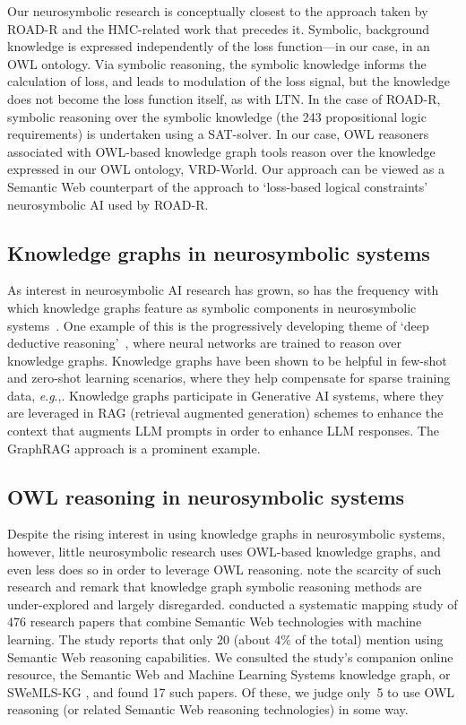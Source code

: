 \documentclass[]{jair}
\newcommand{\eg}{\textit{e}.\textit{g}.,\xspace}
\begin{document}
Our neurosymbolic research is conceptually closest to the approach taken by ROAD-R and the HMC-related work that precedes it.
Symbolic, background knowledge is expressed independently of the loss function---in our case, in an OWL ontology.
Via symbolic reasoning, the symbolic knowledge informs the calculation of loss, and leads to modulation of the loss signal, but the knowledge does not become the loss function itself, as with LTN.
In the case of ROAD-R, symbolic reasoning over the symbolic knowledge (the 243 propositional logic requirements) is undertaken using a SAT-solver.
In our case, OWL reasoners associated with OWL-based knowledge graph tools reason over the knowledge expressed in our OWL ontology, VRD-World.
Our approach can be viewed as a Semantic Web counterpart of the approach to `loss-based logical constraints' neurosymbolic AI used by ROAD-R.

\subsection{Knowledge graphs in neurosymbolic systems}
As interest in neurosymbolic AI research has grown, so has the frequency with which knowledge graphs feature as symbolic components in neurosymbolic systems~\cite{hitzlerKGinNSI2021/splncs}.
One example of this is the progressively developing theme of `deep deductive reasoning'~\cite{DBLP:conf/aaaiss/BianchiH19/iswc2022,DBLP:journals/apin/EbrahimiEBH21,DBLP:conf/aaaiss/EbrahimiSBXEDKH21/iswc2022}, where neural networks are trained to reason over knowledge graphs.
Knowledge graphs have been shown to be helpful in few-shot and zero-shot learning scenarios, where they help compensate for sparse training data, \eg \citet{Chen-Chen-Geng-ISWC-2021,DBLP:journals/semweb/GengCYYZC21,DBLP:journals/corr/abs-2112-10006/iswc2022}.
Knowledge graphs participate in Generative AI systems, where they are leveraged in RAG (retrieval augmented generation) schemes to enhance the context that augments LLM prompts in order to enhance LLM responses. 
The GraphRAG approach \cite{edge2025localglobalgraphrag} is a prominent example.

\subsection{OWL reasoning in neurosymbolic systems}
Despite the rising interest in using knowledge graphs in neurosymbolic systems, however, little neurosymbolic research uses OWL-based knowledge graphs, and even less does so in order to leverage OWL reasoning.
\citet{DBLP:journals/tgdk/dAmatoMMS23} note the scarcity of such research and remark that knowledge graph symbolic reasoning methods are under-explored and largely disregarded.
\citet{Breit-and-Waltersdorfer} conducted a systematic mapping study of 476 research papers that combine Semantic Web technologies with machine learning.
The study reports that only 20 (about 4\% of the total) mention using Semantic Web reasoning capabilities.
We consulted the study's companion online resource, the Semantic Web and Machine Learning Systems knowledge graph, or SWeMLS-KG \cite{DBLP:conf/esws/EkaputraLSEPBRWFA23}, and found 17 such papers.
Of these, we judge only~5 to use OWL reasoning (or 
related Semantic Web reasoning technologies) in some way.
\end{document}
